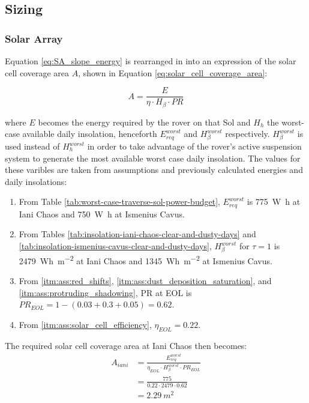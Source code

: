 
\subsection{Sizing}

\subsubsection{Solar Array}
Equation \ref{eq:SA_slope_energy} is rearranged in into an expression of the solar cell coverage area $A$, shown in Equation \ref{eq:solar_cell_coverage_area}:

\begin{equation}
  \label{eq:solar_cell_coverage_area}
  A = \frac{E}{\eta \cdot H_{\beta} \cdot PR}
\end{equation}

where $E$ becomes the energy required by the rover on that Sol and $H_{h}$ the worst-case available daily insolation, henceforth $E_{req}^{worst}$ and $H_{\beta}^{worst}$ respectively. $H_{\beta}^{worst}$ is used instead of $H_{h}^{worst}$ in order to take advantage of the rover's active suspension system to generate the most available worst case daily insolation. The values for these varibles are taken from assumptions and previously calculated energies and daily insolations:

\begin{enumerate}[label=\textbf{\textcolor{BulletBlue}{(\alph*)}}]
    \item From Table \ref{tab:worst-case-traverse-sol-power-budget}, $E_{req}^{worst}$ is \SI{775}{\watt\hour} at Iani Chaos and \SI{750}{\watt\hour} at Ismenius Cavus.
    \item From Tables \ref{tab:insolation-iani-chaos-clear-and-dusty-days} and \ref{tab:insolation-ismenius-cavus-clear-and-dusty-days}, $H_{\beta}^{worst}$ for $\tau=1$ is \SI{2479}{Wh.m^{-2}} at Iani Chaos and \SI{1345}{Wh.m^{-2}} at Ismenius Cavus.
    \item From \ref{itm:ass:red_shifts}, \ref{itm:ass:dust_deposition_saturation}, and \ref{itm:ass:protruding_shadowing}, \ac{PR} at \ac{EOL} is $PR_{EOL} = 1 - (0.03 + 0.3 + 0.05) = 0.62$.
    \item From \ref{itm:ass:solar_cell_efficiency}, $\eta_{EOL} = 0.22$.
\end{enumerate}


The required solar cell coverage area at Iani Chaos then becomes:
\begin{align}
  \label{calc:solar_cell_area_ismenius_cavus}
  A_{iani} &= \frac{E_{req}^{worst}}{\eta_{EOL} \cdot H_{\beta}^{worst} \cdot PR_{EOL}}\\
           &= \frac{775}{0.22 \cdot 2479 \cdot 0.62}\\
           &= \SI{2.29}{m^{2}}
\end{align}

